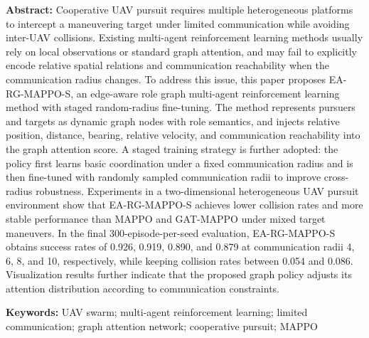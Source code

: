 \documentclass[UTF8,a4paper,11pt]{ctexart}
\begin{document}
\noindent\textbf{Abstract:}
Cooperative UAV pursuit requires multiple heterogeneous platforms to intercept a maneuvering target under limited communication while avoiding inter-UAV collisions. Existing multi-agent reinforcement learning methods usually rely on local observations or standard graph attention, and may fail to explicitly encode relative spatial relations and communication reachability when the communication radius changes. To address this issue, this paper proposes EA-RG-MAPPO-S, an edge-aware role graph multi-agent reinforcement learning method with staged random-radius fine-tuning. The method represents pursuers and targets as dynamic graph nodes with role semantics, and injects relative position, distance, bearing, relative velocity, and communication reachability into the graph attention score. A staged training strategy is further adopted: the policy first learns basic coordination under a fixed communication radius and is then fine-tuned with randomly sampled communication radii to improve cross-radius robustness. Experiments in a two-dimensional heterogeneous UAV pursuit environment show that EA-RG-MAPPO-S achieves lower collision rates and more stable performance than MAPPO and GAT-MAPPO under mixed target maneuvers. In the final 300-episode-per-seed evaluation, EA-RG-MAPPO-S obtains success rates of 0.926, 0.919, 0.890, and 0.879 at communication radii 4, 6, 8, and 10, respectively, while keeping collision rates between 0.054 and 0.086. Visualization results further indicate that the proposed graph policy adjusts its attention distribution according to communication constraints.

\noindent\textbf{Keywords:} UAV swarm; multi-agent reinforcement learning; limited communication; graph attention network; cooperative pursuit; MAPPO












\end{document}
